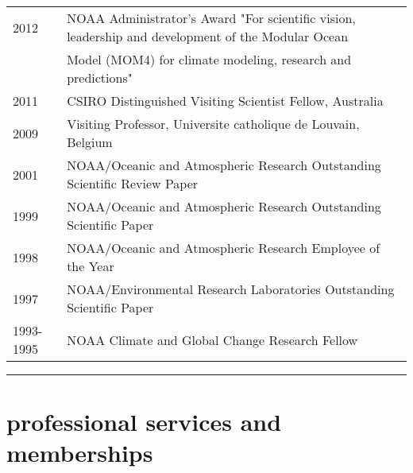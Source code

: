 \documentclass{article}
\begin{document}
\begin{tabular}{ll}
  2012 & NOAA Administrator's Award "For scientific vision, leadership
  and development of 
  the Modular Ocean \\ & Model (MOM4) for climate modeling, research and
  predictions" \\
  2011 & CSIRO Distinguished Visiting Scientist Fellow, Australia \\
  2009 & Visiting Professor, Universite catholique de Louvain, Belgium\\
  2001 & NOAA/Oceanic and Atmospheric Research Outstanding Scientific
  Review Paper\\
  1999 & NOAA/Oceanic and Atmospheric Research Outstanding Scientific Paper\\
  1998 & NOAA/Oceanic and Atmospheric Research Employee of the Year\\
  1997 & NOAA/Environmental Research Laboratories Outstanding Scientific Paper\\
  1993-1995 & NOAA Climate and Global Change Research Fellow
\end{tabular}


\noindent\rule{\textwidth}{1pt}
\vspace{-1cm}
\section*{\sc  \color{Maroon}  professional services and memberships}
\vspace{-.25cm}
\end{document}
